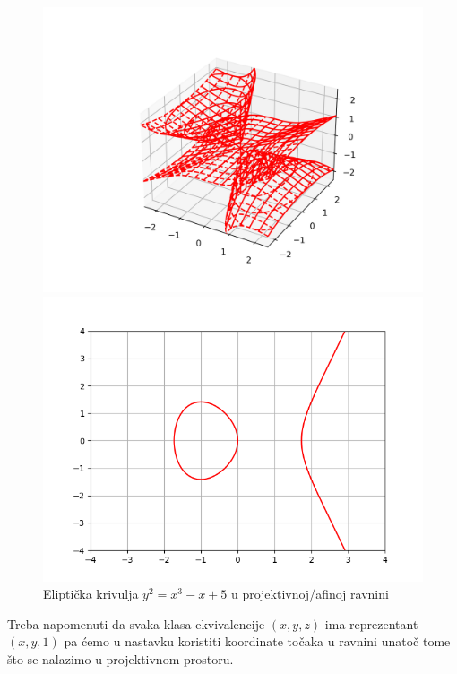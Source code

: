 \documentclass{mathos}
\begin{document}
\begin{figure}[H]
    \begin{minipage}[c]{0.5\linewidth}
        \centering
        \includegraphics[width=\linewidth,keepaspectratio]{3.png}
    \end{minipage}
    \begin{minipage}[c]{0.4\linewidth}
        \centering
        \includegraphics[width=\linewidth,keepaspectratio]{2.png}
    \end{minipage}
    \label{fig1}
    \caption{Eliptička krivulja $y^2 = x^3 - x + 5$ u projektivnoj/afinoj ravnini}
\end{figure}

\begin{nap}
    Treba napomenuti da svaka klasa ekvivalencije $(x, y, z)$ ima reprezentant $(x, y, 1)$ pa ćemo u nastavku koristiti koordinate točaka u ravnini unatoč tome što se nalazimo u projektivnom prostoru.
\end{nap}
\end{document}
